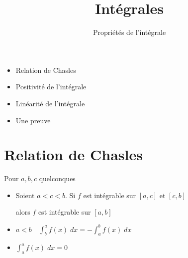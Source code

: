 









\title{{\bf Intégrales}}
\subtitle{Propriétés de l'intégrale}

\begin{frame}
  
  \debutmontitre

  \pause

{\footnotesize
\hfill
{}
\begin{minipage}{0.6\textwidth}
  \begin{itemize}
    \item<3-> Relation de Chasles
    \item<4-> Positivité de l'intégrale
    \item<5-> Linéarité de l'intégrale
    \item<6-> Une preuve
  \end{itemize}
\end{minipage}
}

\end{frame}

\setcounter{framenumber}{0}




\section*{Relation de Chasles}


\begin{frame}

\begin{proposition}
Pour $a,b,c$ quelconques
\end{proposition}


\pause
\bigskip

\begin{itemize}
\setlength{\itemsep}{10pt}
  \item Soient $a<c<b$. Si $f$ est intégrable sur $[a,c]$ et $[c,b]$

 alors $f$ est intégrable sur $[a,b]$

\pause

  \item $a<b  \quad \int_b^a f(x) \;dx= -\int_a^b f(x) \; dx$

\pause

  \item $\int_a^a f(x) \;dx=0$
\end{itemize}

\end{frame}





